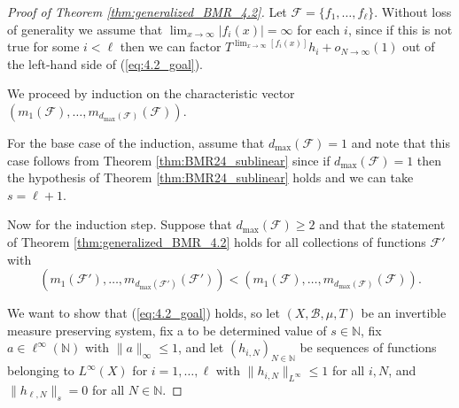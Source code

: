 \documentclass[12pt]{article}
\theoremstyle{plain} %
\theoremstyle{definition} %
\theoremstyle{plain}
\theoremstyle{plain}
\numberwithin{equation}{section}
\newcommand{\N}{\mathbb{N}}
\renewcommand{\leq}{\leqslant}
\renewcommand{\geq}{\geqslant}
\newcommand{\1}{\mathbbm{1}}
\newcommand{\oo}{\infty}
\begin{document}
 
\begin{proof}[Proof of Theorem \ref{thm:generalized_BMR_4.2}]
Let $\mathscr{F} = \{f_1,\dots, f_{\ell}\}$. Without loss of generality we assume that $\lim_{x\to\infty}|f_i(x)|=\oo$ for each $i$, since if this is not true for some $i<\ell$ then we can factor $T^{\lim_{x\to\oo}[f_i(x)]}h_i+o_{N\to\oo}(1)$ out of the left-hand side of (\ref{eq:4.2_goal}).

We proceed by induction on the characteristic vector $(m_1(\mathscr{F}),\dots, m_{d_{\max}(\mathscr{F})}({\mathscr{F}}))$. 


For the base case of the induction, assume that $d_{\max}(\mathscr{F})=1$ and note that this case follows from Theorem \ref{thm:BMR24_sublinear} since if $d_{\max}(\mathscr{F})=1$ then the hypothesis of Theorem \ref{thm:BMR24_sublinear} holds and we can take $s=\ell+1$.



Now for the induction step. Suppose that $d_{\max}(\mathscr{F})\geq 2$ and that the statement of Theorem \ref{thm:generalized_BMR_4.2} holds for all collections of functions $\mathscr{F}'$ with $$
(m_1(\mathscr{F}'),\dots, m_{d_{\max}(\mathscr{F}')}({\mathscr{F}}'))<(m_1(\mathscr{F}),\dots, m_{d_{\max}(\mathscr{F})}({\mathscr{F}})).
$$


We want to show that (\ref{eq:4.2_goal}) holds, so let $(X,\mathscr{B},\mu,T)$ be an invertible measure preserving system, fix a to be determined value of $s\in \N$, fix $a\in \ell^{\oo}(\N)$ with $\|a\|_{\oo}\leq 1$, and let $(h_{i,N})_{N\in \N}$ be sequences of functions belonging to $L^{\oo}(X)$ for $i=1,\dots, \ell$ with $\|h_{i,N}\|_{L^{\oo}}\leq 1$ for all $i,N$, and $\|h_{\ell,N}\|_s=0$ for all $N\in \N$. 


\end{proof}
\end{document}
